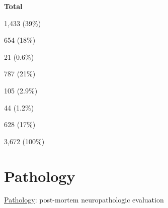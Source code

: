 \documentclass[]{book}
\begin{document}
\textbf{Total}

1,433 (39\%)

654 (18\%)

21 (0.6\%)

787 (21\%)

105 (2.9\%)

44 (1.2\%)

628 (17\%)

3,672 (100\%)

\hypertarget{pathology}{%
\section{Pathology}\label{pathology}}

\href{https://www.radc.rush.edu/docs/var/overview.htm?category=Pathology}{Pathology}: post-mortem neuropathologic evaluation
\end{document}
